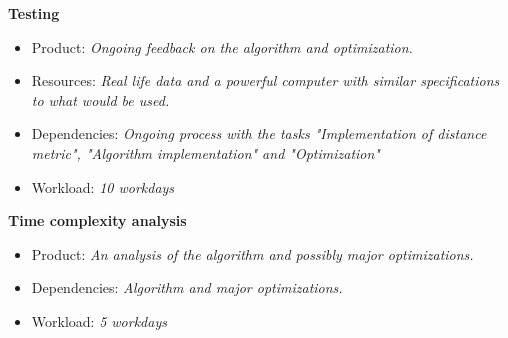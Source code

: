 \documentclass[12pt,a4paper]{article}
\begin{document}
\noindent
\textbf{Testing}
\begin{itemize}
  \item Product: \textit{Ongoing feedback on the algorithm and optimization.}
  \item Resources: \textit{Real life data and a powerful computer with similar
    specifications to what would be used.}
  \item Dependencies: \textit{Ongoing process with the tasks "Implementation of
    distance metric", "Algorithm implementation" and "Optimization"}
  \item Workload: \textit{10 workdays}
\end{itemize}

\noindent
\textbf{Time complexity analysis}
\begin{itemize}
  \item Product: \textit{An analysis of the algorithm and possibly major
    optimizations.}
  \item Dependencies: \textit{Algorithm and major optimizations.}
  \item Workload: \textit{5 workdays}
\end{itemize}


\begin{gantt}[xunitlength=0.5cm,fontsize=\small,titlefontsize=\small]{10}{20}
  \begin{ganttitle}
  \end{ganttitle}
\end{gantt}
\end{document}
